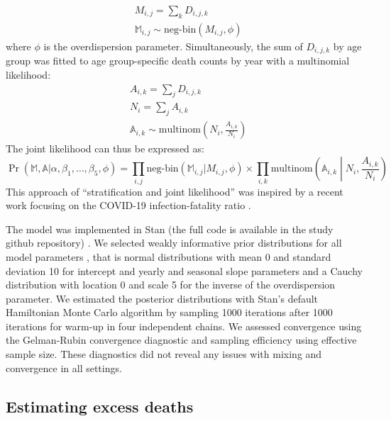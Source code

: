 \documentclass{article}
\begin{document}
	\begin{align}
		&M_{i,j} = \sum_k D_{i,j,k} \\
		&\mathds{M}_{i,j} \sim \text{neg-bin}\left(M_{i,j},\phi\right)
	\end{align}
	where $\phi$ is the overdispersion parameter.
	Simultaneously, the sum of $D_{i,j,k}$ by age group was fitted to age group-specific death counts by year with a multinomial likelihood:
	\begin{align}
		&A_{i,k} = \sum_j D_{i,j,k} \\
		&N_i = \sum_j A_{i,k} \\
		&\mathds{A}_{i,k} \sim \text{multinom}\left(N_i, \frac{A_{i,k}}{N_i}\right)
	\end{align}
	The joint likelihood can thus be expressed as:
	\begin{equation}
		\Pr(\mathds{M},\mathds{A} | \alpha, \beta_1, \ldots, \beta_5,\phi) = \prod_{i,j} \text{neg-bin}\left(\mathds{M}_{i,j} | M_{i,j},\phi\right) \times \prod_{i,k} \text{multinom}\left(\mathds{A}_{i,k} \middle| N_i, \frac{A_{i,k}}{N_i}\right)
	\end{equation}
	This approach of ``stratification and joint likelihood'' was inspired by a recent work focusing on the COVID-19 infection-fatality ratio \cite{hauser2020estimation}.
	
	The model was implemented in Stan (the full code is available in the study github repository) \cite{carpenter2017stan}. We selected weakly informative prior distributions for all model parameters \cite{gelman2020regression,gelman2008weakly}, that is normal distributions with mean 0 and standard deviation 10 for intercept and yearly and seasonal slope parameters and a Cauchy distribution with location 0 and scale 5 for the inverse of the overdispersion parameter. We estimated the posterior distributions with Stan's default Hamiltonian Monte Carlo algorithm \cite{hoffman2014no} by sampling 1000 iterations after 1000 iterations for warm-up in four independent chains. We assessed convergence using the Gelman-Rubin convergence diagnostic and sampling efficiency using effective sample size. These diagnostics did not reveal any issues with mixing and convergence in all settings.
	
	\subsection{Estimating excess deaths}
	
\end{document}
